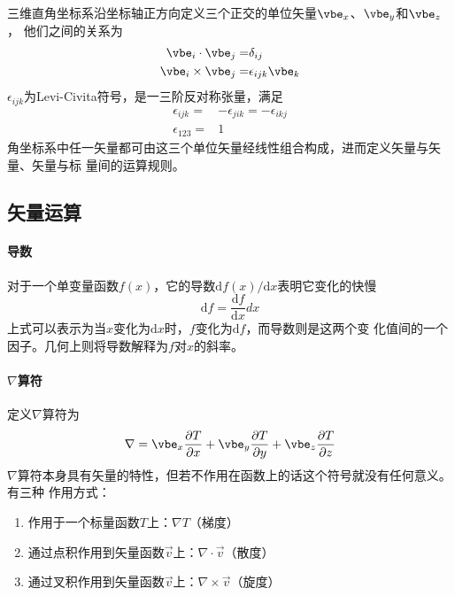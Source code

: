 三维直角坐标系沿坐标轴正方向定义三个正交的单位矢量$\vbe_x$、$\vbe_y$和$\vbe_z$，
他们之间的关系为
\begin{equation}
    \begin{aligned}
        \vbe_{i} \cdot  \vbe_{j} =& \delta_{ij} \\
        \vbe_{i} \times \vbe_{j} =& \epsilon_{ijk} \vbe_{k}
    \end{aligned}
    \label{eq:vec-cartesian}
\end{equation}
$\epsilon_{ijk}$为Levi-Civita符号，是一三阶反对称张量，满足
\begin{equation}
    \begin{aligned}
        \epsilon_{ijk} =& - \epsilon_{jik} = -\epsilon_{ikj} \\
        \epsilon_{123} =& 1
    \end{aligned}
    \label{eq:Levi-Civita}
\end{equation}
角坐标系中任一矢量都可由这三个单位矢量经线性组合构成，进而定义矢量与矢量、矢量与标
量间的运算规则。

\subsection{矢量运算}
\paragraph*{导数}
对于一个单变量函数$f(x)$，它的导数$\mathrm{d} f(x)/ \mathrm{d} x$表明它变化的快慢
\begin{equation}
    \mathrm{d} f = \frac{\mathrm{d} f}{\mathrm{d} x} dx
                                \label{eq:vec-derivative}
\end{equation}
上式可以表示为当$x$变化为$\mathrm{d}x$时，$f$变化为$\mathrm{d}f$，而导数则是这两个变
化值间的一个因子。几何上则将导数解释为$f$对$x$的斜率。

\paragraph*{$\nabla$算符}
定义$\nabla$算符为
\begin{equation}
    \nabla =    \vbe_x \frac{\partial T}{\partial x} 
               +\vbe_y \frac{\partial T}{\partial y}
               +\vbe_z \frac{\partial T}{\partial z}
    \label{eq:nabla-operator}
\end{equation}
$\nabla$算符本身具有矢量的特性，但若不作用在函数上的话这个符号就没有任何意义。有三种
作用方式：
\begin{enumerate}
    \item 作用于一个标量函数$T$上：$\nabla T$（梯度）
    \item 通过点积作用到矢量函数$\vec{v}$上：$\nabla \cdot \vec{v}$（散度）
    \item 通过叉积作用到矢量函数$\vec{v}$上：$\nabla \times \vec{v}$（旋度）
\end{enumerate}

